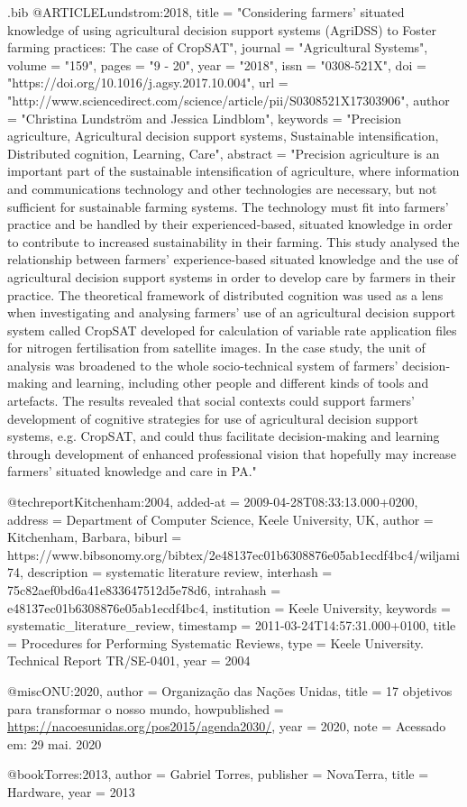 \begin{filecontents}{\jobname.bib}
@ARTICLE{Lundstrom:2018,
  title = "Considering farmers' situated knowledge of using agricultural decision support systems ({AgriDSS}) to Foster farming practices: The case of {CropSAT}",
  journal = "Agricultural Systems",
  volume = "159",
  pages = "9 - 20",
  year = "2018",
  issn = "0308-521X",
  doi = "https://doi.org/10.1016/j.agsy.2017.10.004",
  url = "http://www.sciencedirect.com/science/article/pii/S0308521X17303906",
  author = "Christina Lundström and Jessica Lindblom",
  keywords = "Precision agriculture, Agricultural decision support systems, Sustainable intensification, Distributed cognition, Learning, Care",
  abstract = "Precision agriculture is an important part of the sustainable intensification of agriculture, where information and communications technology and other technologies are necessary, but not sufficient for sustainable farming systems. The technology must fit into farmers' practice and be handled by their experienced-based, situated knowledge in order to contribute to increased sustainability in their farming. This study analysed the relationship between farmers' experience-based situated knowledge and the use of agricultural decision support systems in order to develop care by farmers in their practice. The theoretical framework of distributed cognition was used as a lens when investigating and analysing farmers' use of an agricultural decision support system called CropSAT developed for calculation of variable rate application files for nitrogen fertilisation from satellite images. In the case study, the unit of analysis was broadened to the whole socio-technical system of farmers' decision-making and learning, including other people and different kinds of tools and artefacts. The results revealed that social contexts could support farmers' development of cognitive strategies for use of agricultural decision support systems, e.g. CropSAT, and could thus facilitate decision-making and learning through development of enhanced professional vision that hopefully may increase farmers' situated knowledge and care in PA."
}

@techreport{Kitchenham:2004,
  added-at = {2009-04-28T08:33:13.000+0200},
  address = {Department of Computer Science, Keele University, UK},
  author = {Kitchenham, Barbara},
  biburl = {https://www.bibsonomy.org/bibtex/2e48137ec01b6308876e05ab1ecdf4bc4/wiljami74},
  description = {systematic literature review},
  interhash = {75c82aef0bd6a41e833647512d5e78d6},
  intrahash = {e48137ec01b6308876e05ab1ecdf4bc4},
  institution = {Keele University},
  keywords = {systematic_literature_review},
  timestamp = {2011-03-24T14:57:31.000+0100},
  title = {Procedures for Performing Systematic Reviews},
  type = {Keele University. Technical Report TR/SE-0401},
  year = 2004
}

@misc{ONU:2020,
  author = {{Organização das Nações Unidas}},
  title = {17 objetivos para transformar o nosso mundo},
  howpublished = {\url {https://nacoesunidas.org/pos2015/agenda2030/}},
  year =  {2020},
  note = {Acessado em: 29 mai. 2020}
}

@book{Torres:2013,
  author = {Gabriel Torres},
  publisher = {NovaTerra},
  title = {Hardware},
  year = {2013}
}
\end{filecontents}

